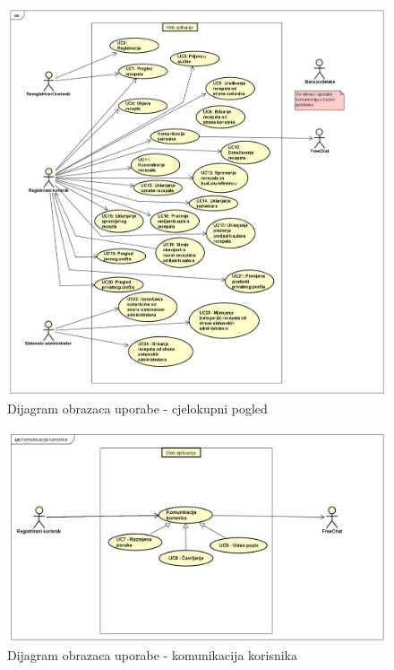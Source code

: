 					\begin{figure}[H]
						\includegraphics[scale= 0.4]{slike/UseCaseDiagram0.png}
						\centering
						\caption{Dijagram obrazaca uporabe - cjelokupni pogled}
						\label{fig:Dijagram obrazaca uporabe - cjelokupni pogled}
					\end{figure}
					\eject
					\begin{figure}[H]
						\includegraphics[scale= 0.4]{slike/UseCaseDiagram1.png}
						\centering
						\caption{Dijagram obrazaca uporabe - komunikacija korisnika}
						\label{fig:Dijagram obrazaca uporabe - komunikacija korisnika}
					\end{figure}
					 
